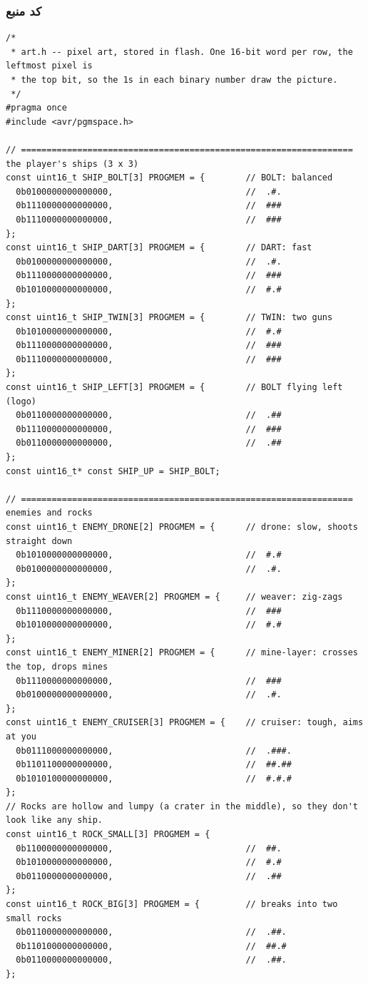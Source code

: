 \documentclass[11pt,a4paper]{article}
\begin{document}
\subsubsection*{کد منبع}
\begin{latin}
\begin{lstlisting}[language=Arduino]
/*
 * art.h -- pixel art, stored in flash. One 16-bit word per row, the leftmost pixel is
 * the top bit, so the 1s in each binary number draw the picture.
 */
#pragma once
#include <avr/pgmspace.h>

// ================================================================= the player's ships (3 x 3)
const uint16_t SHIP_BOLT[3] PROGMEM = {        // BOLT: balanced
  0b0100000000000000,                          //  .#.
  0b1110000000000000,                          //  ###
  0b1110000000000000,                          //  ###
};
const uint16_t SHIP_DART[3] PROGMEM = {        // DART: fast
  0b0100000000000000,                          //  .#.
  0b1110000000000000,                          //  ###
  0b1010000000000000,                          //  #.#
};
const uint16_t SHIP_TWIN[3] PROGMEM = {        // TWIN: two guns
  0b1010000000000000,                          //  #.#
  0b1110000000000000,                          //  ###
  0b1110000000000000,                          //  ###
};
const uint16_t SHIP_LEFT[3] PROGMEM = {        // BOLT flying left (logo)
  0b0110000000000000,                          //  .##
  0b1110000000000000,                          //  ###
  0b0110000000000000,                          //  .##
};
const uint16_t* const SHIP_UP = SHIP_BOLT;

// ================================================================= enemies and rocks
const uint16_t ENEMY_DRONE[2] PROGMEM = {      // drone: slow, shoots straight down
  0b1010000000000000,                          //  #.#
  0b0100000000000000,                          //  .#.
};
const uint16_t ENEMY_WEAVER[2] PROGMEM = {     // weaver: zig-zags
  0b1110000000000000,                          //  ###
  0b1010000000000000,                          //  #.#
};
const uint16_t ENEMY_MINER[2] PROGMEM = {      // mine-layer: crosses the top, drops mines
  0b1110000000000000,                          //  ###
  0b0100000000000000,                          //  .#.
};
const uint16_t ENEMY_CRUISER[3] PROGMEM = {    // cruiser: tough, aims at you
  0b0111000000000000,                          //  .###.
  0b1101100000000000,                          //  ##.##
  0b1010100000000000,                          //  #.#.#
};
// Rocks are hollow and lumpy (a crater in the middle), so they don't look like any ship.
const uint16_t ROCK_SMALL[3] PROGMEM = {
  0b1100000000000000,                          //  ##.
  0b1010000000000000,                          //  #.#
  0b0110000000000000,                          //  .##
};
const uint16_t ROCK_BIG[3] PROGMEM = {         // breaks into two small rocks
  0b0110000000000000,                          //  .##.
  0b1101000000000000,                          //  ##.#
  0b0110000000000000,                          //  .##.
};



\end{lstlisting}
\end{latin}
\end{document}
